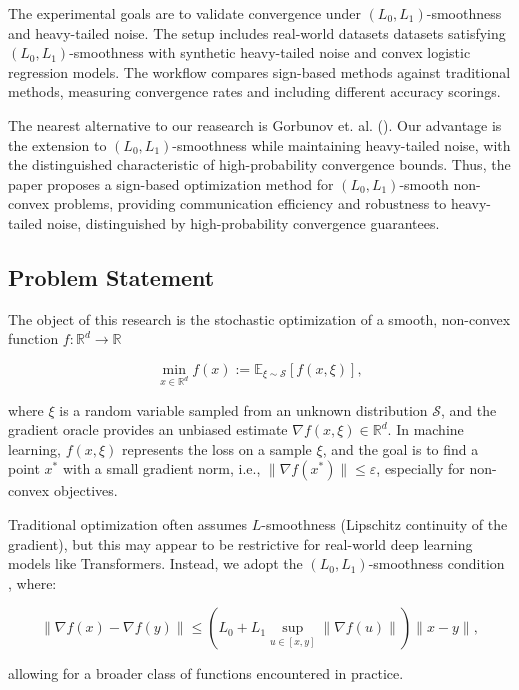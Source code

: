 \documentclass[12pt]{article}
\begin{document}
The experimental goals are to validate convergence under $(L_0, L_1)$-smoothness and heavy-tailed noise. The setup includes real-world datasets datasets satisfying $(L_0, L_1)$-smoothness with synthetic heavy-tailed noise and convex logistic regression models. The workflow compares sign-based methods against traditional methods, measuring convergence rates and including different accuracy scorings.

The nearest alternative to our reasearch is Gorbunov et. al. (\cite{gorbunov}). Our advantage is the extension to $(L_0, L_1)$-smoothness while maintaining heavy-tailed noise, with the distinguished characteristic of high-probability convergence bounds. Thus, the paper proposes a sign-based optimization method for $(L_0, L_1)$-smooth non-convex problems, providing communication efficiency and robustness to heavy-tailed noise, distinguished by high-probability convergence guarantees.

\subsection*{Problem Statement}

The object of this research is the stochastic optimization of a smooth, non-convex function $f: \mathbb{R}^d \to \mathbb{R}$

\[
\min_{x \in \mathbb{R}^d} f(x) := \mathbb{E}_{\xi \sim \mathcal{S}} [f(x, \xi)],
\]

where $\xi$ is a random variable sampled from an unknown distribution $\mathcal{S}$, and the gradient oracle provides an unbiased estimate $\nabla f(x, \xi) \in \mathbb{R}^d$. In machine learning, $f(x, \xi)$ represents the loss on a sample $\xi$, and the goal is to find a point $x^*$ with a small gradient norm, i.e., $\|\nabla f(x^*)\| \leq \varepsilon$, especially for non-convex objectives.

Traditional optimization often assumes $L$-smoothness (Lipschitz continuity of the gradient), but this may appear to be restrictive for real-world deep learning models like Transformers. Instead, we adopt the $(L_0, L_1)$-smoothness condition \cite{gorbunov}, where:

\[
\|\nabla f(x) - \nabla f(y)\| \leq \left(L_0 + L_1 \sup_{u \in [x,y]} \|\nabla f(u)\|\right) \|x - y\|,
\]

allowing for a broader class of functions encountered in practice.
\end{document}
